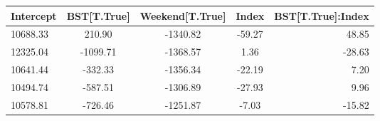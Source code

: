\begin{tabular}{lcccr}
\toprule
Intercept & BST[T.True] & Weekend[T.True] & Index & BST[T.True]:Index \\
\midrule
10688.33 & 210.90 & -1340.82 & -59.27 & 48.85 \\
12325.04 & -1099.71 & -1368.57 & 1.36 & -28.63 \\
10641.44 & -332.33 & -1356.34 & -22.19 & 7.20 \\
10494.74 & -587.51 & -1306.89 & -27.93 & 9.96 \\
10578.81 & -726.46 & -1251.87 & -7.03 & -15.82 \\
\bottomrule
\end{tabular}
